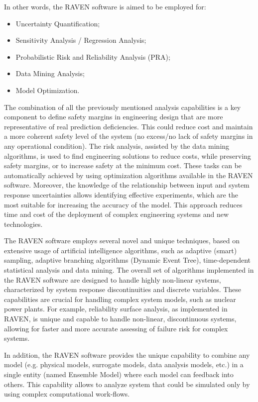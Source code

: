 In other words, the RAVEN software is aimed to be employed for:
\begin{itemize}
  \item Uncertainty Quantification;
  \item Sensitivity Analysis / Regression Analysis;
  \item Probabilistic Risk and Reliability Analysis (PRA);
  \item Data Mining Analysis;
  \item Model Optimization.
\end{itemize}

The combination of all the previously mentioned analysis capabilities is a key component to 
define safety margins in engineering design that are more representative of real prediction deficiencies. 
This could reduce 
cost and maintain a more coherent safety level of the system (no excess/no lack of safety margins in any operational 
condition).
The risk analysis, assisted by the data mining algorithms, is used to find engineering solutions to reduce costs, while 
preserving safety margins, or to increase safety at the minimum cost. These tasks can be automatically achieved by using 
optimization algorithms available in the RAVEN software.
Moreover, the knowledge of the relationship between input and system response uncertainties allows identifying effective 
experiments, which are the most suitable for increasing the accuracy of the model. This approach reduces time and cost 
of the deployment of complex engineering systems and new technologies.

The RAVEN software employs several novel and unique techniques, based on extensive usage of artificial intelligence 
algorithms, such as adaptive (smart) sampling, adaptive branching algorithms (Dynamic Event Tree), time-dependent 
statistical analysis and data mining. 
The overall set of algorithms implemented in the RAVEN software are designed to handle highly non-linear systems, 
characterized by system response discontinuities and discrete variables. These capabilities are crucial for handling 
complex system models, such as nuclear power plants.
For example, reliability surface analysis, as implemented in RAVEN, is unique and capable to handle non-linear, 
discontinuous systems, allowing for faster and more accurate assessing of failure risk for complex systems.

In addition, the RAVEN software provides the unique capability to combine any model (e.g. physical models, surrogate 
models, data analysis models, etc.) in a single entity (named Ensemble Model) where each model can feedback into others. This capability allows to analyze system that could be simulated only by using complex computational work-flows.

